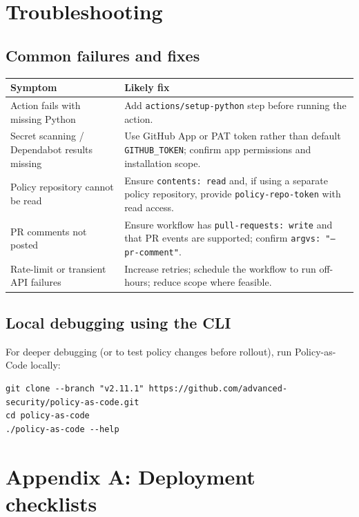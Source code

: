 \documentclass[11pt]{article}
\renewcommand{\cmd}[1]{\texttt{#1}}
\begin{document}
\section{Troubleshooting}

\subsection{Common failures and fixes}

\begin{longtable}{@{}p{}p{}@{}}
\toprule
Symptom & Likely fix \\
\midrule
Action fails with missing Python & Add \cmd{actions/setup-python} step before running the action. \\
Secret scanning / Dependabot results missing & Use GitHub App or PAT token rather than default \cmd{GITHUB\_TOKEN}; confirm app permissions and installation scope. \\
Policy repository cannot be read & Ensure \cmd{contents: read} and, if using a separate policy repository, provide \cmd{policy-repo-token} with read access. \\
PR comments not posted & Ensure workflow has \cmd{pull-requests: write} and that PR events are supported; confirm \cmd{argvs: "--pr-comment"}. \\
Rate-limit or transient API failures & Increase retries; schedule the workflow to run off-hours; reduce scope where feasible. \\
\bottomrule
\end{longtable}

\subsection{Local debugging using the CLI}

For deeper debugging (or to test policy changes before rollout), run Policy-as-Code locally:
\begin{verbatim}
git clone --branch "v2.11.1" https://github.com/advanced-security/policy-as-code.git
cd policy-as-code
./policy-as-code --help
\end{verbatim}

\section{Appendix A: Deployment checklists}
\end{document}
